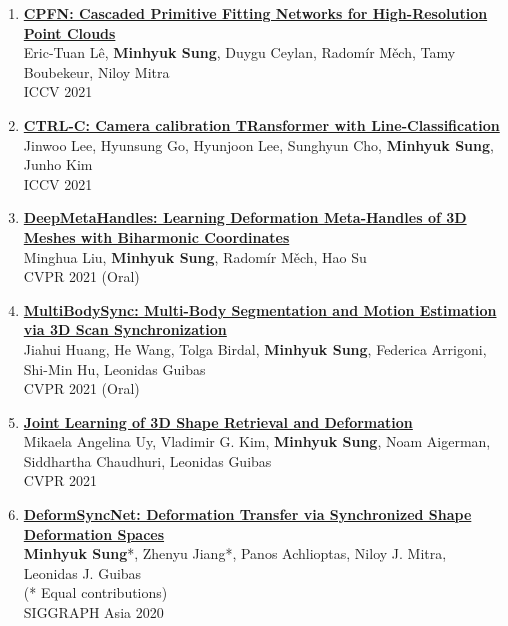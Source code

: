 \documentclass[letterpaper,10pt]{article} %
\newcommand{\blankline}{\quad\pagebreak[2]}
\begin{document}
{{\begin{enumerate}
\item \label{iccv21_2}
\href{https://arxiv.org/abs/2109.00113}{\textbf{CPFN: Cascaded Primitive Fitting Networks for High-Resolution Point Clouds}}\\
Eric-Tuan Lê, \textbf{Minhyuk Sung}, Duygu Ceylan, Radomír Měch, Tamy Boubekeur, Niloy Mitra\\
ICCV 2021\\
\blankline

\item \label{iccv21_1}
\href{https://arxiv.org/abs/2109.02259}{\textbf{CTRL-C: Camera calibration TRansformer with Line-Classification}}\\
Jinwoo Lee, Hyunsung Go, Hyunjoon Lee, Sunghyun Cho, \textbf{Minhyuk Sung}, Junho Kim\\
ICCV 2021\\
\blankline

\item \label{cvpr21_3}
\href{https://mhsung.github.io/papers/deep-meta-handles.html}{\textbf{DeepMetaHandles: Learning Deformation Meta-Handles of 3D Meshes with Biharmonic Coordinates}}\\
Minghua Liu, \textbf{Minhyuk Sung}, Radomír Měch, Hao Su\\
CVPR 2021 (Oral)\\
\blankline

\item \label{cvpr21_2}
\href{https://cg.cs.tsinghua.edu.cn/people/~huangjh/publication/multibodysync/}{\textbf{MultiBodySync: Multi-Body Segmentation and Motion Estimation via 3D Scan Synchronization}}\\
Jiahui Huang, He Wang, Tolga Birdal, \textbf{Minhyuk Sung}, Federica Arrigoni, Shi-Min Hu, Leonidas Guibas\\
CVPR 2021 (Oral)\\
\blankline

\item \label{cvpr21_1}
\href{https://joint-retrieval-deformation.github.io/}{\textbf{Joint Learning of 3D Shape Retrieval and Deformation}}\\
Mikaela Angelina Uy, Vladimir G. Kim, \textbf{Minhyuk Sung}, Noam Aigerman, Siddhartha Chaudhuri, Leonidas Guibas\\
CVPR 2021\\
\blankline

\item \label{siggraphasia20}
\href{https://mhsung.github.io/papers/deform-sync-net.html}{\textbf{DeformSyncNet: Deformation Transfer via Synchronized Shape Deformation Spaces}}\\
\textbf{Minhyuk Sung}*, Zhenyu Jiang*, Panos Achlioptas, Niloy J. Mitra, Leonidas J. Guibas\\
(* Equal contributions)\\
SIGGRAPH Asia 2020\\
\blankline


\end{enumerate}}}
\end{document}
